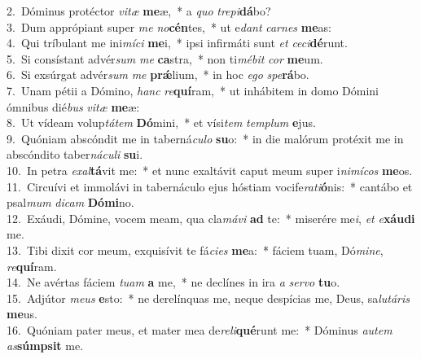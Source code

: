 {2.~}Dóminus protéctor \textit{vi}\textit{tæ} \textbf{me}æ,~* a \textit{quo} \textit{tre}\textit{pi}\textbf{dá}bo?\\
{3.~}Dum apprópiant super \textit{me} \textit{no}\textbf{cén}tes,~* ut e\textit{dant} \textit{car}\textit{nes} \textbf{me}as:\\
{4.~}Qui tríbulant me ini\textit{mí}\textit{ci} \textbf{me}i,~* ipsi infirmáti sunt \textit{et} \textit{ce}\textit{ci}\textbf{dé}runt.\\
{5.~}Si consístant advér\textit{sum} \textit{me} \textbf{ca}stra,~* non ti\textit{mé}\textit{bit} \textit{cor} \textbf{me}um.\\
{6.~}Si exsúrgat advér\textit{sum} \textit{me} \textbf{prǽ}lium,~* in hoc \textit{e}\textit{go} \textit{spe}\textbf{rá}bo.\\
{7.~}Unam pétii a Dómino, \textit{hanc} \textit{re}\textbf{quí}ram,~* ut inhábitem in domo Dómini ómnibus dié\textit{bus} \textit{vi}\textit{tæ} \textbf{me}æ:\\
{8.~}Ut vídeam volup\textit{tá}\textit{tem} \textbf{Dó}mini,~* et vísi\textit{tem} \textit{tem}\textit{plum} \textbf{e}jus.\\
{9.~}Quóniam abscóndit me in taberná\textit{cu}\textit{lo} \textbf{su}o:~* in die malórum protéxit me in abscóndito taber\textit{ná}\textit{cu}\textit{li} \textbf{su}i.\\
{10.~}In petra \textit{e}\textit{xal}\textbf{tá}vit me:~* et nunc exaltávit caput meum super i\textit{ni}\textit{mí}\textit{cos} \textbf{me}os.\\
{11.~}Circuívi et immolávi in tabernáculo ejus hóstiam vocife\textit{ra}\textit{ti}\textbf{ó}nis:~* cantábo et psal\textit{mum} \textit{di}\textit{cam} \textbf{Dó}\textbf{mi}no.\\
{12.~}Exáudi, Dómine, vocem meam, qua cla\textit{má}\textit{vi} \textbf{ad} te:~* miserére me\textit{i}, \textit{et} \textit{e}\textbf{xáu}\textbf{di} me.\\
{13.~}Tibi dixit cor meum, exquisívit te fá\textit{ci}\textit{es} \textbf{me}a:~* fáciem tuam, Dó\textit{mi}\textit{ne}, \textit{re}\textbf{quí}ram.\\
{14.~}Ne avértas fáciem \textit{tu}\textit{am} \textbf{a} me,~* ne declínes in ira \textit{a} \textit{ser}\textit{vo} \textbf{tu}o.\\
{15.~}Adjútor \textit{me}\textit{us} \textbf{e}sto:~* ne derelínquas me, neque despícias me, Deus, sa\textit{lu}\textit{tá}\textit{ris} \textbf{me}us.\\
{16.~}Quóniam pater meus, et mater mea de\textit{re}\textit{li}\textbf{qué}runt me:~* Dóminus \textit{au}\textit{tem} \textit{as}\textbf{súm}\textbf{psit} me.\\
